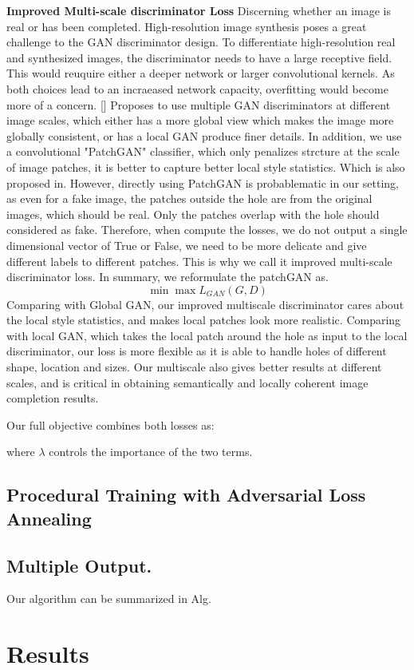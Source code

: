 \documentclass[runningheads]{llncs}
\begin{document}
\noindent\textbf{Improved Multi-scale discriminator Loss} Discerning whether an image is real or has been completed. High-resolution image synthesis poses a great challenge to the GAN discriminator design. To differentiate high-resolution real and synthesized images, the discriminator needs to have a large receptive field. This would reuquire either a deeper network or larger convolutional kernels. As both choices lead to an incraeased network capacity, overfitting would become more of a concern. [] Proposes to use multiple GAN discriminators at different image scales, which either has a more global view which makes the image more globally consistent, or has a local GAN produce finer details. In addition, we use a convolutional "PatchGAN" classifier, which only penalizes strcture at the scale of image patches, it is better to capture better local style statistics. Which is also proposed in. However, directly using PatchGAN is probablematic in our setting, as even for a fake image, the patches outside the hole are from the original images, which should be real. Only the patches overlap with the hole should considered as fake. Therefore, when compute the losses, we do not output a single dimensional vector of True or False, we need to be more delicate and give different labels to different patches. This is why we call it improved multi-scale discriminator loss. In summary, we reformulate the patchGAN as.
\[
\min\max L_{GAN}(G,D)
\]
Comparing with Global GAN, our improved multiscale discriminator cares about the local style statistics, and makes local patches look more realistic. Comparing with local GAN, which takes the local patch around the hole as input to the local discriminator, our loss is more flexible as it is able to handle holes of different shape, location and sizes. Our multiscale also gives better results at different scales, and is critical in obtaining semantically and locally coherent image completion results.

Our full objective combines both losses as:

where $\lambda$ controls the importance of the two terms.

\subsection{Procedural Training with Adversarial Loss Annealing}

\subsection{Multiple Output.}

Our algorithm can be summarized in Alg.
\section{Results}
\label{sec:results}

\clearpage



\end{document}
